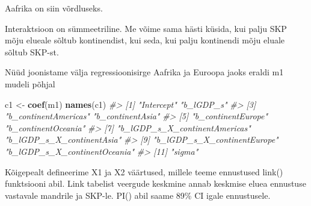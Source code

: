 \documentclass[]{book}
\newenvironment{Shaded}{\begin{snugshade}}{\end{snugshade}}
\newcommand{\KeywordTok}[1]{\textcolor[rgb]{0.13,0.29,0.53}{\textbf{#1}}}
\newcommand{\StringTok}[1]{\textcolor[rgb]{0.31,0.60,0.02}{#1}}
\newcommand{\CommentTok}[1]{\textcolor[rgb]{0.56,0.35,0.01}{\textit{#1}}}
\newcommand{\NormalTok}[1]{#1}
\begin{document}
Aafrika on siin võrdluseks.

Interaktsioon on sümmeetriline. Me võime sama hästi küsida, kui palju
SKP mõju elueale sõltub kontinendist, kui seda, kui palju kontinendi
mõju eluale sõltub SKP-st.

Nüüd joonistame välja regressioonisirge Aafrika ja Euroopa jaoks eraldi
m1 mudeli põhjal

\begin{Shaded}
\begin{Highlighting}[]
\NormalTok{c1 <-}\StringTok{ }\KeywordTok{coef}\NormalTok{(m1)}
\KeywordTok{names}\NormalTok{(c1)}
\CommentTok{#>  [1] "Intercept"                    "b_lGDP_s"                    }
\CommentTok{#>  [3] "b_continentAmericas"          "b_continentAsia"             }
\CommentTok{#>  [5] "b_continentEurope"            "b_continentOceania"          }
\CommentTok{#>  [7] "b_lGDP_s_X_continentAmericas" "b_lGDP_s_X_continentAsia"    }
\CommentTok{#>  [9] "b_lGDP_s_X_continentEurope"   "b_lGDP_s_X_continentOceania" }
\CommentTok{#> [11] "sigma"}
\end{Highlighting}
\end{Shaded}

Kõigepealt defineerime X1 ja X2 väärtused, millele teeme ennustused
link() funktsiooni abil. Link tabelist veergude keskmine annab keskmise
eluea ennustuse vastavale mandrile ja SKP-le. PI() abil saame 89\% CI
igale ennustusele.
\end{document}
